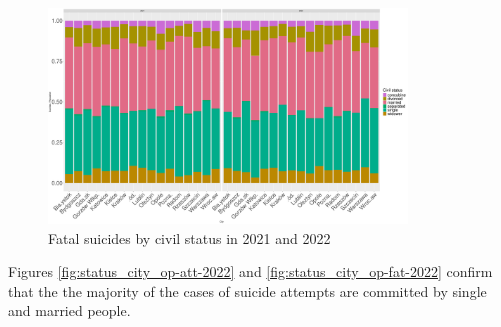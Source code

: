 \documentclass{article}
\begin{document}
\begin{figure}[H]
    \centering
    \includegraphics[width=0.85\textwidth]{imgs/status_city_fat_suicides-2122.pdf}
    \caption{Fatal suicides by civil status  in 2021 and 2022}
    \label{fig:status_city_fat_suicides-2122}
\end{figure}
%
%
Figures \ref{fig:status_city_op-att-2022} and \ref{fig:status_city_op-fat-2022}
confirm that the the majority of the cases of suicide attempts are committed
by single and married people.
\end{document}
